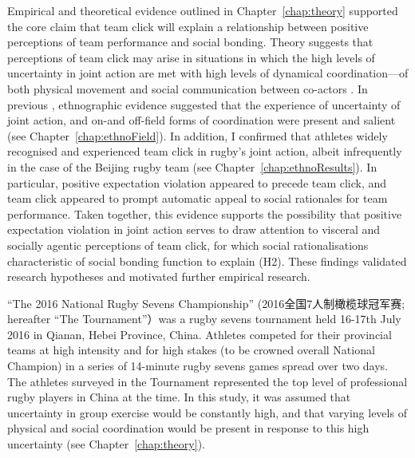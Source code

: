 \begin{CJK}{UTF8}{gbsn}
Empirical and theoretical evidence outlined in Chapter~\ref{chap:theory} supported the core claim that team click will explain a relationship between positive perceptions of team performance and social bonding.  Theory suggests that perceptions of team click may arise in situations in which the high levels of uncertainty in joint action are met with high levels of dynamical coordination---of both physical movement and social communication between co-actors \citep{Semin2008}.  In previous , ethnographic evidence suggested that the experience of uncertainty of joint action, and on-and off-field forms of coordination were present and salient  (see Chapter~\ref{chap:ethnoField}).  In addition, I confirmed that athletes widely recognised and experienced team click in rugby’s joint action, albeit infrequently in the case of the Beijing rugby team (see Chapter~\ref{chap:ethnoResults}).  In particular, positive expectation violation appeared to precede team click,  and team click appeared to prompt automatic appeal to social rationales for team performance.  Taken together, this evidence supports the possibility that positive expectation violation in joint action serves to draw attention to visceral and socially agentic perceptions of team click, for which social rationalisations characteristic of social bonding function to explain (H2).   These findings validated research hypotheses and motivated further empirical research.

``The 2016 National Rugby Sevens Championship'' (2016全国7人制橄榄球冠军赛; hereafter ``The Tournament''）was a rugby sevens tournament held 16-17th July 2016 in Qianan, Hebei Province, China.  Athletes competed for their provincial teams at high intensity and for high stakes (to be crowned overall National Champion) in a series of 14-minute rugby sevens games spread over two days.  The athletes surveyed in the Tournament represented the top level of professional rugby players in China at the time.  In this study, it was assumed that uncertainty in group exercise would be constantly high, and that varying levels of physical and social coordination would be present in response to this high uncertainty (see Chapter~\ref{chap:theory}).


\end{CJK}
